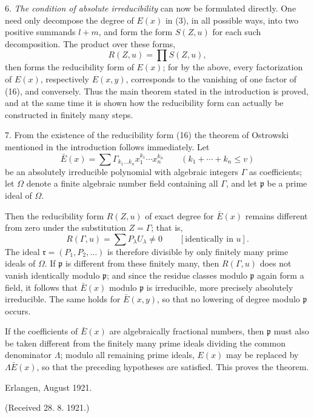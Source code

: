 6. \emph{The condition of absolute irreducibility} can now be formulated directly. One need only decompose the degree of $E(x)$ in (3), in all possible ways, into two positive summands $l+m$, and form the form $S(Z,u)$ for each such decomposition. The product over these forms,
\begin{equation}
 R(Z,u)=\prod S(Z,u),
\tag{16}
\end{equation}
then forms the reducibility form of $E(x)$; for by the above, every factorization of $E(x)$, respectively $E(x,y)$, corresponds to the vanishing of one factor of (16), and conversely. Thus the main theorem stated in the introduction is proved, and at the same time it is shown how the reducibility form can actually be constructed in finitely many steps.

7. From the existence of the reducibility form (16) the theorem of Ostrowski mentioned in the introduction follows immediately. Let
\[
 \bar E(x)=\sum \Gamma_{k_1\ldots k_n}x_1^{k_1}\cdots x_n^{k_n}
 \qquad(k_1+\cdots+k_n\le v)
\]
be an absolutely irreducible polynomial with algebraic integers $\Gamma$ as coefficients; let $\Omega$ denote a finite algebraic number field containing all $\Gamma$, and let $\mathfrak p$ be a prime ideal of $\Omega$.

Then the reducibility form $R(Z,u)$ of exact degree for $\bar E(x)$ remains different from zero under the substitution $Z=\Gamma$; that is,
\[
 R(\Gamma,u)=\sum P_\lambda U_\lambda\ne0\qquad[\text{identically in }u].
\]
The ideal $\mathfrak r=(P_1,P_2,\ldots)$ is therefore divisible by only finitely many prime ideals of $\Omega$. If $\mathfrak p$ is different from these finitely many, then $R(\Gamma,u)$ does not vanish identically modulo $\mathfrak p$; and since the residue classes modulo $\mathfrak p$ again form a field, it follows that $\bar E(x)$ modulo $\mathfrak p$ is irreducible, more precisely absolutely irreducible. The same holds for $\bar E(x,y)$, so that no lowering of degree modulo $\mathfrak p$ occurs.

If the coefficients of $\bar E(x)$ are algebraically fractional numbers, then $\mathfrak p$ must also be taken different from the finitely many prime ideals dividing the common denominator $\Lambda$; modulo all remaining prime ideals, $E(x)$ may be replaced by $\Lambda\bar E(x)$, so that the preceding hypotheses are satisfied. This proves the theorem.

\begin{flushleft}
Erlangen, August 1921.
\end{flushleft}
\begin{center}
(Received 28. 8. 1921.)
\end{center}

\clearpage
